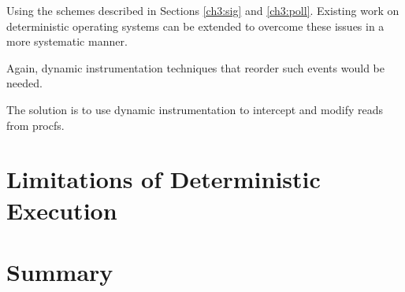 Using the schemes described
in Sections \ref{ch3:sig} and 
\ref{ch3:poll}. Existing
work on deterministic
operating systems can
be extended to overcome these issues
in a more systematic manner.

Again, dynamic instrumentation techniques that 
reorder such events would be needed.


The solution is to use dynamic instrumentation
to intercept and modify reads 
from procfs.

\section{Limitations of Deterministic Execution} \label{ch3:issues}
\section {Summary}
